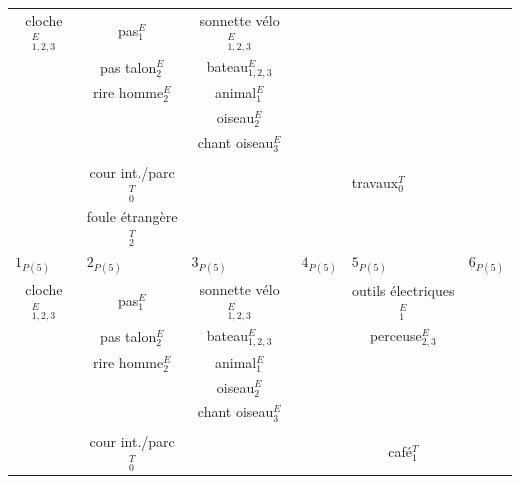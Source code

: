 \begin{table}[t]
\begin{tabular}{c|c|c|c|c|c|c}
cloche$_{1,2,3}^E$ & pas$_{1}^E$                   & sonnette vélo$_{1,2,3}^E$ & \multicolumn{3}{c|}{}              &  \\
                        & pas talon$_{2}^E$        & bateau$_{1,2,3}^E$        & \multicolumn{3}{c|}{}              & \\
                        & rire homme$_{2}^E$       & animal$_{1}^E$            & \multicolumn{3}{c|}{}              & \\
                        &                          & oiseau$_2^E$              & \multicolumn{3}{c|}{}              & \\
                        &                          & chant oiseau$_3^E$        & \multicolumn{3}{c|}{}              & \\		
                        &                          &                           & \multicolumn{3}{c|}{}              & \\	
                        & cour int./parc$_0^T$     &                           & \multicolumn{3}{c|}{travaux$_0^T$} & \\
                        & foule étrangère$_2^T$    &                           & \multicolumn{3}{c|}{}              & \\		
\hline
\multicolumn{1}{l|}{$1_{P(5)}$} & \multicolumn{1}{l|}{$2_{P(5)}$} & \multicolumn{1}{l|}{$3_{P(5)}$}  & \multicolumn{2}{l|}{$4_{P(5)}$} & \multicolumn{1}{l|}{$5_{P(5)}$} & \multicolumn{1}{l}{$6_{P(5)}$}\\ 
cloche$_{1,2,3}^E$      & pas$_{1}^E$        & sonnette vélo$_{1,2,3}^E$ & \multicolumn{2}{c|}{} & outils électriques$_1^E$ &  \\     
                         & pas talon$_{2}^E$ & bateau$_{1,2,3}^E$       & \multicolumn{2}{c|}{} & perceuse$_{2,3}^E$  & \\  
                         & rire homme$_{2}^E$      & animal$_{1}^E$     & \multicolumn{2}{c|}{} &                     &  \\  
                         &                         & oiseau$_2^E$       & \multicolumn{2}{c|}{} &                     &  \\     
                         &                         & chant oiseau$_3^E$ & \multicolumn{2}{c|}{} &                     &  \\      
                         &                         &                    & \multicolumn{2}{c|}{} &                     &  \\      
                         &  cour int./parc$_0^T$   &                    & \multicolumn{2}{c|}{} & café$_1^T$          &  \\   

\end{tabular}
\end{table}
